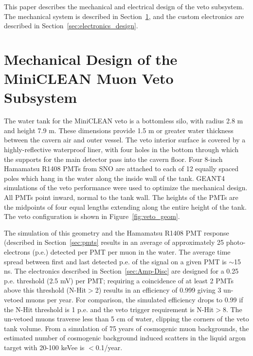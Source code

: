 \documentclass{JINST}
\begin{document}
This paper describes the mechanical and electrical design of the veto
subsystem.  The mechanical system is described in
Section~\ref{sec:subsystem_design}, and the custom electronics are
described in Section~\ref{sec:electronics_design}.


\section{Mechanical Design of the MiniCLEAN Muon Veto Subsystem}
\label{sec:subsystem_design}
%
The water tank for the MiniCLEAN veto is a bottomless silo, with
radius 2.8 m and height 7.9 m. These dimensions provide 1.5 m or
greater water thickness between the cavern air and outer vessel. The
veto interior surface is covered by a highly-reflective waterproof liner, with four
holes in the bottom through which the supports for the main detector
pass into the cavern floor. Four 8-inch Hamamatsu R1408 PMTs from SNO are
attached to each of 12 equally spaced poles which hang in the water
along the inside wall of the tank. GEANT4~\cite{ref:geant4} simulations
of the veto performance were used to optimize the mechanical
design. All PMTs point inward, normal to the tank wall. The heights
of the PMTs are the midpoints of four equal lengths extending along
the entire height of the tank. The veto configuration is shown in
Figure~\ref{fig:veto_geom}.  

The simulation of this geometry and the Hamamatsu R1408 PMT response (described
in Section~\ref{sec:pmts} results in an average of approximately 25
photo-electrons (p.e.) detected per PMT per muon in the water.  The
average time spread between first and last detected p.e. of the signal
on a given PMT is $\sim$15 ns.  The electronics described in
Section~\ref{sec:Amp-Disc} are designed for a 0.25 p.e. threshold (2.5
mV) per PMT; requiring a coincidence of at least 2 PMTs above this
threshold (N-Hit$>$2) results in an efficiency of 0.999 giving 3
un-vetoed muons per year.  For comparison, the simulated efficiency
drops to 0.99 if the N-Hit threshold is 1 p.e. and the veto trigger
requirement is N-Hit$>$8.  The un-vetoed muons traverse less than 5 cm
of water, clipping the corners of the veto tank volume.  From a
simulation of 75 years of cosmogenic muon backgrounds, the estimated
number of cosmogenic background induced scatters in the liquid argon
target with 20-100 keVee is $<$0.1/year.
\end{document}
